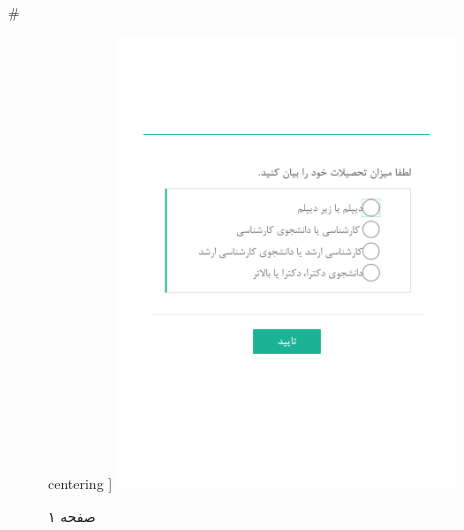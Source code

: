 { 
 # 
\begin{figure}[htpb]
centering ]
\includegraphics[width=0.8\textwidth]{./img/Task9.png/}
\caption{صفحه ۱}
\label{fig:Task1}
\end{figure}
 
 
}
